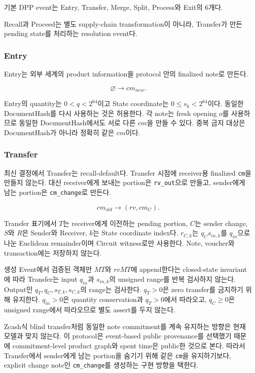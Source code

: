 \documentclass[11pt]{extarticle}
\begin{document}
기본 DPP event는 Entry, Transfer, Merge, Split, Process와 Exit의 6개다.

Recall과 Proceed는 별도 supply-chain transformation이 아니라, Transfer가
만든 pending state를 처리하는 resolution event다.

\subsubsection{Entry}\label{entry}

Entry는 외부 세계의 product information을 protocol 안의 finalized note로
만든다.

\[
\varnothing\longrightarrow cm_{new}.
\]

Entry의 quantity는 $0<q<2^{64}$이고 State coordinate는
$0\leq s_k<2^{64}$이다. 동일한 DocumentHash를 다시 사용하는 것은 허용한다.
각 note는 fresh opening $o$를 사용하므로 동일한 DocumentHash에서도 서로 다른 $cm$을
만들 수 있다. 중복 금지 대상은 DocumentHash가 아니라 정확히 같은 $cm$이다.

\subsubsection{Transfer}\label{transfer}

최신 결정에서 Transfer는 recall-default다. Transfer 시점에 receiver용
finalized \texttt{cm}을 만들지 않는다. 대신 receiver에게 보내는
portion은 \texttt{rv\_out}으로 만들고, sender에게 남는 portion은
\texttt{cm\_change}로 만든다.

\[
cm_{old}\longrightarrow (rv,cm_C).
\]

Transfer 표기에서 $T$는 receiver에게 이전하는 pending portion, $C$는 sender change,
$S$와 $R$은 Sender와 Receiver, $k$는 State coordinate index다. $r_{C,k}$는
$q_Cs_{in,k}$를 $q_{in}$으로 나눈 Euclidean remainder이며 Circuit witness로만 사용한다.
Note, voucher와 transaction에는 저장하지 않는다.

생성 Event에서 검증된 객체만 $MT$와 $rvMT$에 append한다는 closed-state invariant에
따라 Transfer는 input $q_{in}$과 $s_{in,k}$의 unsigned range를 반복 검사하지 않는다.
Output인 $q_T,q_C,s_{T,k},s_{C,k}$의 range는 검사한다. $q_T>0$은 zero transfer를
금지하기 위해 유지한다. $q_{in}>0$은 quantity conservation과 $q_T>0$에서 따라오고,
$q_C\geq0$은 unsigned range에서 따라오므로 별도 assert를 두지 않는다.

Zcash식 blind transfer처럼 동일한 note commitment를 계속 유지하는 방향은
현재 모델과 맞지 않는다. 이 protocol은 event-based public provenance를
선택했기 때문에 commitment-level product graph와 spent time은 public한
것으로 본다. 따라서 Transfer에서 sender에게 남는 portion을 숨기기 위해
같은 \texttt{cm}을 유지하기보다, explicit change note인
\texttt{cm\_change}를 생성하는 구현 방향을 택한다.
\end{document}
